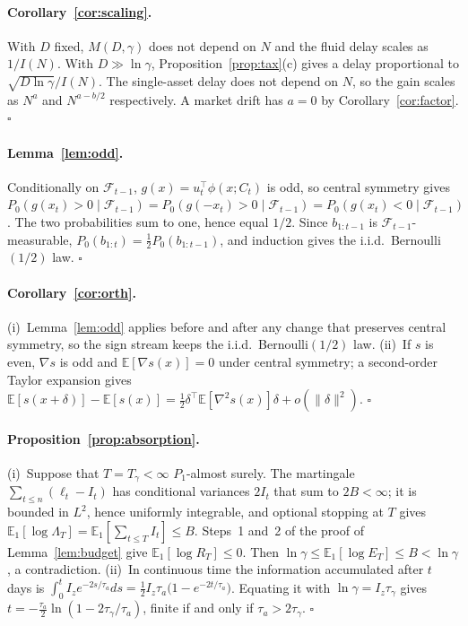 \paragraph{Corollary~\ref{cor:scaling}.}
With $D$ fixed, $M(D,\gamma)$ does not depend on $N$ and the fluid delay scales as $1/I(N)$. With $D\gg\ln\gamma$, Proposition~\ref{prop:tax}(c) gives a delay proportional to $\sqrt{D\ln\gamma}/I(N)$. The single-asset delay does not depend on $N$, so the gain scales as $N^{a}$ and $N^{a-b/2}$ respectively. A market drift has $a=0$ by Corollary~\ref{cor:factor}. \hfill$\square$

\paragraph{Lemma~\ref{lem:odd}.}
Conditionally on $\mathcal{F}_{t-1}$, $g(x)=u_t^{\top}\phi(x;C_t)$ is odd, so central symmetry gives $P_0(g(x_t)>0\mid\mathcal{F}_{t-1})=P_0(g(-x_t)>0\mid\mathcal{F}_{t-1})=P_0(g(x_t)<0\mid\mathcal{F}_{t-1})$. The two probabilities sum to one, hence equal $1/2$. Since $b_{1:t-1}$ is $\mathcal{F}_{t-1}$-measurable, $P_0(b_{1:t})=\tfrac12P_0(b_{1:t-1})$, and induction gives the i.i.d.\ Bernoulli$(1/2)$ law. \hfill$\square$

\paragraph{Corollary~\ref{cor:orth}.}
(i)~Lemma~\ref{lem:odd} applies before and after any change that preserves central symmetry, so the sign stream keeps the i.i.d.\ Bernoulli$(1/2)$ law. (ii)~If $s$ is even, $\nabla s$ is odd and $\mathbb{E}[\nabla s(x)]=0$ under central symmetry; a second-order Taylor expansion gives $\mathbb{E}[s(x+\delta)]-\mathbb{E}[s(x)]=\tfrac12\delta^{\top}\mathbb{E}[\nabla^2s(x)]\delta+o(\|\delta\|^2)$. \hfill$\square$

\paragraph{Proposition~\ref{prop:absorption}.}
(i)~Suppose that $T=T_\gamma<\infty$ $P_1$-almost surely. The martingale $\sum_{t\le n}(\ell_t-I_t)$ has conditional variances $2I_t$ that sum to $2B<\infty$; it is bounded in $L^2$, hence uniformly integrable, and optional stopping at $T$ gives $\mathbb{E}_1[\log\Lambda_T]=\mathbb{E}_1[\sum_{t\le T}I_t]\le B$. Steps~1 and~2 of the proof of Lemma~\ref{lem:budget} give $\mathbb{E}_1[\log R_T]\le0$. Then $\ln\gamma\le\mathbb{E}_1[\log E_T]\le B<\ln\gamma$, a contradiction.
(ii)~In continuous time the information accumulated after $t$ days is $\int_0^tI_ze^{-2s/\tau_a}ds=\tfrac12I_z\tau_a\big(1-e^{-2t/\tau_a}\big)$. Equating it with $\ln\gamma=I_z\tau_\gamma$ gives $t=-\tfrac{\tau_a}{2}\ln(1-2\tau_\gamma/\tau_a)$, finite if and only if $\tau_a>2\tau_\gamma$. \hfill$\square$
